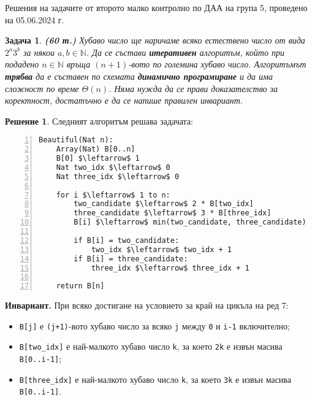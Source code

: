 \documentclass{article}
\newtheorem{problem}{Задача}
\theoremstyle{definition}
\newtheorem*{solution}{Решение}
\begin{document}
\begin{center}
    \Large{Решения на задачите от второто малко контролно по ДАА на група 5, проведено на 05.06.2024 г.}
\end{center}

\vspace*{4mm}

\begin{problem} {\bf (60 т.)}
\textit{Хубаво} число ще наричаме всяко естествено число  от вида $2^a 3^b$ за някои $a, b \in \mathbb{N}$.
Да се състави \textbf{итеративен} алгоритъм, който при подадено $n \in \mathbb{N}$ връща $(n + 1)$-вото по големина хубаво число.
Алгоритъмът \textbf{трябва} да е съставен по схемата \textbf{динамично програмиране} и да има сложност по време $\Theta(n)$.
Няма нужда да се прави доказателство за коректност, достатъчно е да се напише правилен инвариант.
\end{problem}

\begin{solution}
    Следният алгоритъм решава задачата:
    \begin{Verbatim}[frame=single, numbers=left,commandchars=\\\{\},codes={\catcode`$=3}]
Beautiful(Nat n):
    Аrray(Nat) B[0..n]
    B[0] $\leftarrow$ 1
    Nat two_idx $\leftarrow$ 0
    Nat three_idx $\leftarrow$ 0

    for i $\leftarrow$ 1 to n:
        two_candidate $\leftarrow$ 2 * B[two_idx]
        three_candidate $\leftarrow$ 3 * B[three_idx]
        B[i] $\leftarrow$ min(two_candidate, three_candidate)

        if B[i] = two_candidate:
            two_idx $\leftarrow$ two_idx + 1
        if B[i] = three_candidate:
            three_idx $\leftarrow$ three_idx + 1

    return B[n]
    \end{Verbatim}

    \textbf{Инвариант.} При всяко достигане на условието за край на цикъла на ред 7:
    \begin{itemize}
        \item {\tt B[j]} е {\tt (j+1)}-вото хубаво число за всяко {\tt j} между {\tt 0} и {\tt i-1} включително;
        \item {\tt B[two\_idx]} е най-малкото хубаво число {\tt k}, за което {\tt 2k} е извън масива {\tt B[0..i-1]};
        \item {\tt B[three\_idx]} е най-малкото хубаво число {\tt k}, за което {\tt 3k} е извън масива {\tt B[0..i-1]}.
    \end{itemize}
\end{solution}
\end{document}

